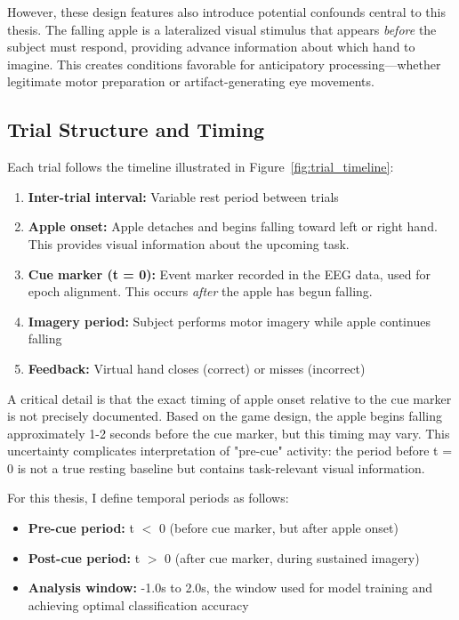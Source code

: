 However, these design features also introduce potential confounds central to this thesis. The falling apple is a lateralized visual stimulus that appears \textit{before} the subject must respond, providing advance information about which hand to imagine. This creates conditions favorable for anticipatory processing—whether legitimate motor preparation or artifact-generating eye movements.


\subsection{Trial Structure and Timing}
\label{subsec:methods_trial_structure}

Each trial follows the timeline illustrated in Figure~\ref{fig:trial_timeline}:

\begin{enumerate}
    \item \textbf{Inter-trial interval:} Variable rest period between trials
    \item \textbf{Apple onset:} Apple detaches and begins falling toward left or right hand. This provides visual information about the upcoming task.
    \item \textbf{Cue marker (t = 0):} Event marker recorded in the EEG data, used for epoch alignment. This occurs \textit{after} the apple has begun falling.
    \item \textbf{Imagery period:} Subject performs motor imagery while apple continues falling
    \item \textbf{Feedback:} Virtual hand closes (correct) or misses (incorrect)
\end{enumerate}


A critical detail is that the exact timing of apple onset relative to the cue marker is not precisely documented. Based on the game design, the apple begins falling approximately 1-2 seconds before the cue marker, but this timing may vary. This uncertainty complicates interpretation of "pre-cue" activity: the period before t = 0 is not a true resting baseline but contains task-relevant visual information.

For this thesis, I define temporal periods as follows:

\begin{itemize}
    \item \textbf{Pre-cue period:} t $<$ 0 (before cue marker, but after apple onset)
    \item \textbf{Post-cue period:} t $>$ 0 (after cue marker, during sustained imagery)
    \item \textbf{Analysis window:} -1.0s to 2.0s, the window used for model training and achieving optimal classification accuracy
\end{itemize}



